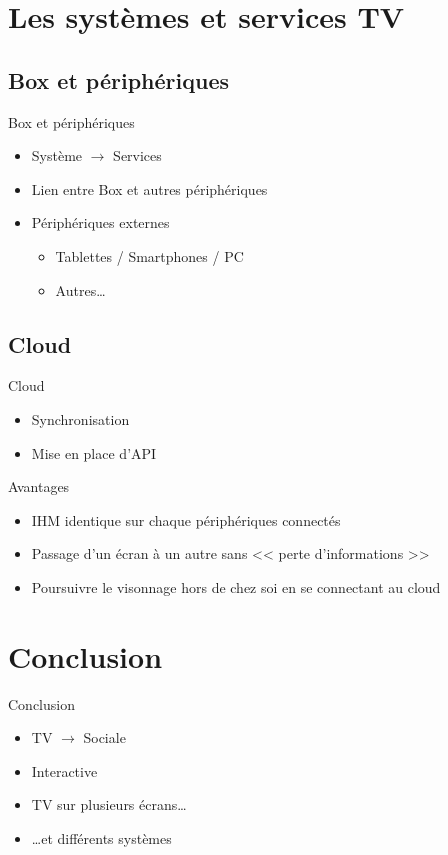 \documentclass{beamer}
\begin{document}
	\section{Les systèmes et services TV}
	\subsection{Box et périphériques}
	\begin{frame}{Box et périphériques}
		\begin{itemize}
			\item Système $\rightarrow$ Services
		\pause
			\item Lien entre Box et autres périphériques
		\pause
			\item Périphériques externes
				\begin{itemize}
					\item Tablettes / Smartphones / PC
					\item Autres\ldots
				\end{itemize}
		\end{itemize}
	\end{frame}
	\subsection{Cloud}
	\begin{frame}{Cloud}
		\begin{itemize}
			\item Synchronisation
		\pause
			\item Mise en place d'API
		\end{itemize}
		\begin{exampleblock}{Avantages}
			\begin{itemize}
				\item IHM identique sur chaque périphériques connectés
				\item Passage d'un écran à un autre sans << perte d'informations >>
				\item Poursuivre le visonnage hors de chez soi en se connectant au cloud
			\end{itemize}
		\end{exampleblock}
	\end{frame}

	\section*{Conclusion}
	\begin{frame}{Conclusion}
		\begin{itemize}
			\item TV $\rightarrow$ Sociale
				\pause
			\item Interactive
				\pause
			\item TV sur plusieurs écrans\ldots
				\pause
			\item \ldots et différents systèmes
		\end{itemize}
	\end{frame}
\end{document}
